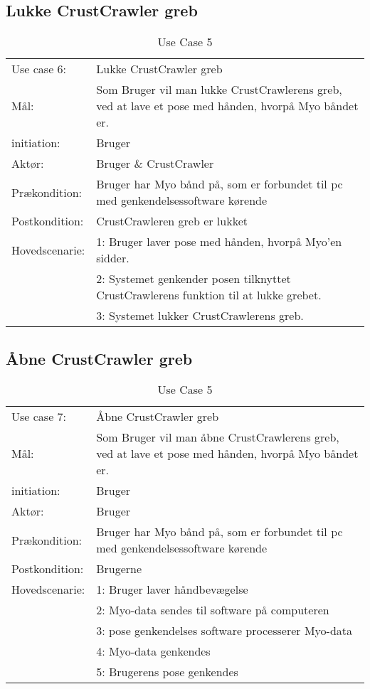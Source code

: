 \subsection{Lukke CrustCrawler greb}
\begin{center}
	\begin{table}[htbp]
		\begin{tabular}{lp{10cm}}
			\rowcolor{grey} Use case 6:		& Lukke CrustCrawler greb \\
			Mål: & Som Bruger vil man lukke CrustCrawlerens greb, ved at lave et pose  med hånden, hvorpå Myo båndet er. \\
			initiation:	& Bruger \\
			Aktør: & Bruger \& CrustCrawler\\
			Prækondition: & Bruger har Myo bånd på, som er forbundet til pc med genkendelsessoftware kørende \\
			Postkondition: & CrustCrawleren greb er lukket \\
			Hovedscenarie: & 1: Bruger laver pose med hånden, hvorpå Myo'en sidder. \\
			& 2: Systemet genkender posen tilknyttet CrustCrawlerens funktion til at lukke grebet.\\
			& 3: Systemet lukker CrustCrawlerens greb.\\

		\end{tabular}
		\caption{Use Case 5}
	\end{table}
\end{center}

\subsection{Åbne CrustCrawler greb}
\begin{center}
	\begin{table}[htbp]
		\begin{tabular}{lp{10cm}}
			\rowcolor{grey} Use case 7:		& Åbne CrustCrawler greb\\
			Mål: & Som Bruger vil man åbne CrustCrawlerens greb, ved at lave et pose  med hånden, hvorpå Myo båndet er.\\
			initiation:	& Bruger \\
			Aktør: & Bruger\\
			Prækondition: & Bruger har Myo bånd på, som er forbundet til pc med genkendelsessoftware kørende \\
			Postkondition: & Brugerne  \\
			Hovedscenarie: & 1: Bruger laver håndbevægelse \\
			& 2: Myo-data sendes til software på computeren\\
			& 3: pose genkendelses software processerer Myo-data\\
			& 4: Myo-data genkendes\\
			& 5: Brugerens pose genkendes\\
		\end{tabular}
		\caption{Use Case 5}
	\end{table}
\end{center}

\egroup